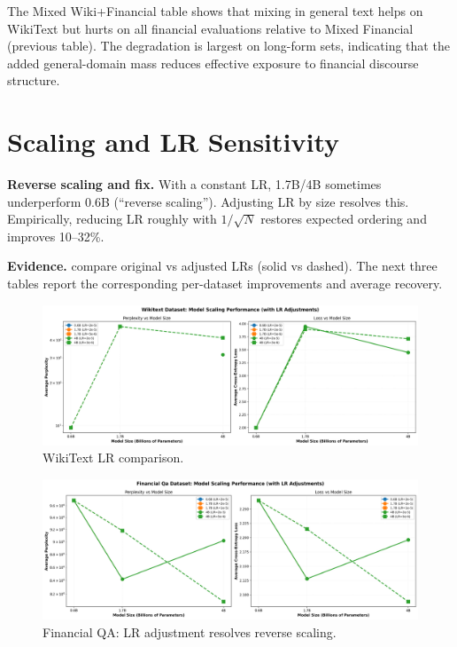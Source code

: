 The Mixed Wiki+Financial table shows that mixing in general text helps on WikiText but hurts on all financial evaluations relative to Mixed Financial (previous table). The degradation is largest on long-form sets, indicating that the added general-domain mass reduces effective exposure to financial discourse structure.

\section{Scaling and LR Sensitivity}
\textbf{Reverse scaling and fix.} With a constant LR, 1.7B/4B sometimes underperform 0.6B (``reverse scaling''). Adjusting LR by size resolves this. Empirically, reducing LR roughly with $1/\sqrt{N}$ restores expected ordering and improves 10--32\%.

\textbf{Evidence.}  compare original vs adjusted LRs (solid vs dashed). The next three tables report the corresponding per-dataset improvements and average recovery.

\begin{figure}[H]
  \centering
  \includegraphics[width=\textwidth]{../thesis/figures/scaling_wikitext.png}
  \caption{WikiText LR comparison.}\label{fig:scaling_wikitext}
\end{figure}



\begin{figure}[H]
  \centering
  \includegraphics[width=\textwidth]{../thesis/figures/scaling_financial_qa.png}
  \caption{Financial QA: LR adjustment resolves reverse scaling.}\label{fig:scaling_financial_qa}
\end{figure}

